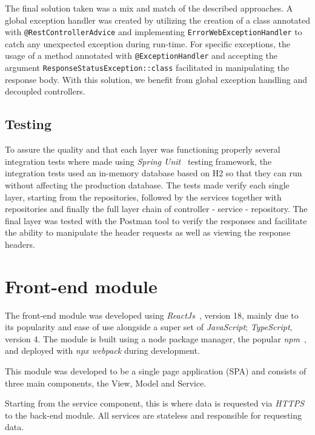 The final solution taken was a mix and match of the described approaches. A global exception handler was created by utilizing the creation of a class annotated with \texttt{@RestControllerAdvice} and implementing \texttt{ErrorWebExceptionHandler} to catch any unexpected exception during run-time. For specific exceptions, the usage of a method annotated with \texttt{@ExceptionHandler} and accepting the argument \texttt{ResponseStatusException::class} facilitated in manipulating the response body. With this solution, we benefit from global exception handling and decoupled controllers.


\subsection{Testing}

To assure the quality and that each layer was functioning properly several integration tests where made using \textit{Spring Unit}~\cite{spring-testing-unit} testing framework, the integration tests used an in-memory database based on H2 so that they can run without affecting the production database. The tests made verify each single layer, starting from the repositories, followed by the services together with repositories and finally the full layer chain of controller - service - repository. The final layer was tested with the Postman tool to verify the responses and facilitate the ability to manipulate the header requests as well as viewing the response headers.



\section{Front-end module}

The front-end module was developed using \textit{ReactJs}~\cite{reactjs}, version 18, mainly due to its popularity and ease of use alongside a super set of \textit{JavaScript}; \textit{TypeScript}, version 4. The module is built using a node package manager, the popular \textit{npm}~\cite{npm}, and deployed with \textit{npx webpack} during development. 

This module was developed to be a single page application (SPA) and consists of three main components, the View, Model and Service.

Starting from the service component, this is where data is requested via \textit{HTTPS} to the back-end module.
All services are stateless and responsible for requesting data.

